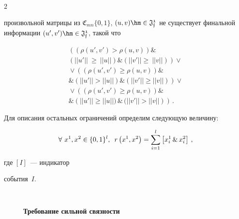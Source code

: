 \begin{multicols}{2}
\begin{description}
произвольной матрицы из $\mathfrak{C}_{mn}\{0,1\}$, $(u,v) \hm\in  


\mathfrak{J_f^1}$ не существует финальной информации  $(u',v') \hm\in  


\mathfrak{J_f^1}$, такой что


\begin{multline*}


\left (\left(\rho(u',v') > \rho(u,v)\right)   \& \right. \\  


\left.\left(||u'||~\geq~||u||\right)  \&  \left(||v'||\geq~||v||\right) \right) 


\vee{} \\ 


{}\vee \left( \left(\rho(u',v') \geq \rho(u,v)\right)  \& \right. \\ 


\left.\&   \left(||u'|| > ||u||\right)  \&  \left(||v'||\geq ||v||\right) \right) 


\vee{} \\ 


{}\vee \left( \left(\rho(u',v') \geq \rho(u,v)\right) \& \right.\\ 


\left.\&  \left(||u'|| \ge ||u||\bigr) \, \& \, \bigl(||v'|| > ||v||\right) \right)\,.


\end{multline*}


\end{description}











Для описания остальных ограничений определим следующую величину: 


$$


\forall\ x^1, 


x^2  \in \{0,1\}^l,\enskip r\left(x^1, x^2\right) = \sum\limits_{i=1}^l 


\left[ x^1_i\, \&\, x^2_i\right]\,,


$$ 


где $[I]$~--- индикатор 


события~$I$.





\begin{description}


\item[\,] \textbf{Требование сильной связности}






\end{description}
\end{multicols}
